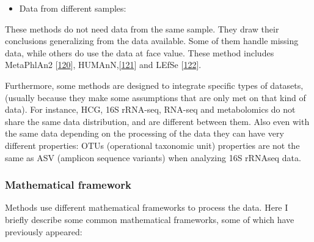 \documentclass[
  a4paper,
]{book}
\providecommand{\tightlist}{%
  \setlength{\itemsep}{0pt}\setlength{\parskip}{0pt}}
\begin{document}
\begin{itemize}
\tightlist
\item
  Data from different samples:
\end{itemize}

These methods do not need data from the same sample.
They draw their conclusions generalizing from the data available.
Some of them handle missing data, while others do use the data at face value.
These method includes MetaPhlAn2 {[}\protect\hyperlink{ref-franzosaSpecieslevelFunctionalProfiling2018}{120}{]}, HUMAnN,{[}\protect\hyperlink{ref-truongMetaPhlAn2EnhancedMetagenomic2015}{121}{]} and LEfSe {[}\protect\hyperlink{ref-segataMetagenomicBiomarkerDiscovery2011}{122}{]}.

Furthermore, some methods are designed to integrate specific types of datasets, (usually because they make some assumptions that are only met on that kind of data).
For instance, HCG, 16S rRNA-seq, RNA-seq and metabolomics do not share the same data distribution, and are different between them.
Also even with the same data depending on the processing of the data they can have very different properties: OTUs (operational taxonomic unit) properties are not the same as ASV (amplicon sequence variants) when analyzing 16S rRNAseq data.

\hypertarget{mathematical-framework}{%
\subsubsection{Mathematical framework}\label{mathematical-framework}}

Methods use different mathematical frameworks to process the data.
Here I briefly describe some common mathematical frameworks, some of which have previously appeared:
\end{document}
